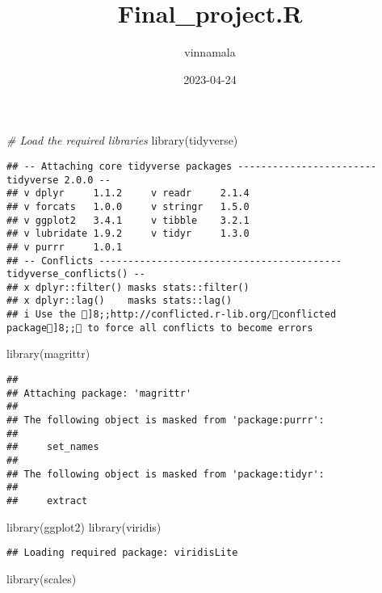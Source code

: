 \documentclass[
]{article}
\title{Final\_project.R}
\author{vinnamala}
\date{2023-04-24}
\newenvironment{Shaded}{\begin{snugshade}}{\end{snugshade}}
\newcommand{\CommentTok}[1]{\textcolor[rgb]{0.56,0.35,0.01}{\textit{#1}}}
\newcommand{\FunctionTok}[1]{\textcolor[rgb]{0.00,0.00,0.00}{#1}}
\newcommand{\NormalTok}[1]{#1}
\begin{document}
\maketitle

\begin{Shaded}
\begin{Highlighting}[]
\CommentTok{\# Load the required libraries}
\FunctionTok{library}\NormalTok{(tidyverse)}
\end{Highlighting}
\end{Shaded}

\begin{verbatim}
## -- Attaching core tidyverse packages ------------------------ tidyverse 2.0.0 --
## v dplyr     1.1.2     v readr     2.1.4
## v forcats   1.0.0     v stringr   1.5.0
## v ggplot2   3.4.1     v tibble    3.2.1
## v lubridate 1.9.2     v tidyr     1.3.0
## v purrr     1.0.1     
## -- Conflicts ------------------------------------------ tidyverse_conflicts() --
## x dplyr::filter() masks stats::filter()
## x dplyr::lag()    masks stats::lag()
## i Use the ]8;;http://conflicted.r-lib.org/conflicted package]8;; to force all conflicts to become errors
\end{verbatim}

\begin{Shaded}
\begin{Highlighting}[]
\FunctionTok{library}\NormalTok{(magrittr)}
\end{Highlighting}
\end{Shaded}

\begin{verbatim}
## 
## Attaching package: 'magrittr'
## 
## The following object is masked from 'package:purrr':
## 
##     set_names
## 
## The following object is masked from 'package:tidyr':
## 
##     extract
\end{verbatim}

\begin{Shaded}
\begin{Highlighting}[]
\FunctionTok{library}\NormalTok{(ggplot2)}
\FunctionTok{library}\NormalTok{(viridis)}
\end{Highlighting}
\end{Shaded}

\begin{verbatim}
## Loading required package: viridisLite
\end{verbatim}

\begin{Shaded}
\begin{Highlighting}[]
\FunctionTok{library}\NormalTok{(scales)}
\end{Highlighting}
\end{Shaded}
\end{document}
